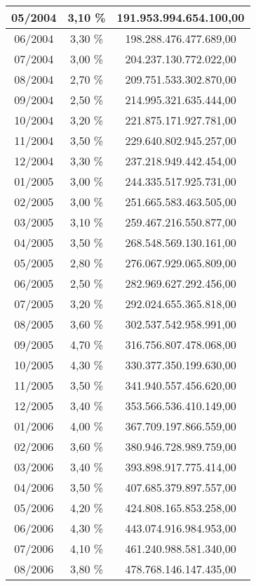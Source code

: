 \begin{center}
\begin{longtable}{|c|c|c|}
05/2004 & 3,10 \% & 191.953.994.654.100,00 \\ \hline
06/2004 & 3,30 \% & 198.288.476.477.689,00 \\ \hline
07/2004 & 3,00 \% & 204.237.130.772.022,00 \\ \hline
08/2004 & 2,70 \% & 209.751.533.302.870,00 \\ \hline
09/2004 & 2,50 \% & 214.995.321.635.444,00 \\ \hline
10/2004 & 3,20 \% & 221.875.171.927.781,00 \\ \hline
11/2004 & 3,50 \% & 229.640.802.945.257,00 \\ \hline
12/2004 & 3,30 \% & 237.218.949.442.454,00 \\ \hline
01/2005 & 3,00 \% & 244.335.517.925.731,00 \\ \hline
02/2005 & 3,00 \% & 251.665.583.463.505,00 \\ \hline
03/2005 & 3,10 \% & 259.467.216.550.877,00 \\ \hline
04/2005 & 3,50 \% & 268.548.569.130.161,00 \\ \hline
05/2005 & 2,80 \% & 276.067.929.065.809,00 \\ \hline
06/2005 & 2,50 \% & 282.969.627.292.456,00 \\ \hline
07/2005 & 3,20 \% & 292.024.655.365.818,00 \\ \hline
08/2005 & 3,60 \% & 302.537.542.958.991,00 \\ \hline
09/2005 & 4,70 \% & 316.756.807.478.068,00 \\ \hline
10/2005 & 4,30 \% & 330.377.350.199.630,00 \\ \hline
11/2005 & 3,50 \% & 341.940.557.456.620,00 \\ \hline
12/2005 & 3,40 \% & 353.566.536.410.149,00 \\ \hline
01/2006 & 4,00 \% & 367.709.197.866.559,00 \\ \hline
02/2006 & 3,60 \% & 380.946.728.989.759,00 \\ \hline
03/2006 & 3,40 \% & 393.898.917.775.414,00 \\ \hline
04/2006 & 3,50 \% & 407.685.379.897.557,00 \\ \hline
05/2006 & 4,20 \% & 424.808.165.853.258,00 \\ \hline
06/2006 & 4,30 \% & 443.074.916.984.953,00 \\ \hline
07/2006 & 4,10 \% & 461.240.988.581.340,00 \\ \hline
08/2006 & 3,80 \% & 478.768.146.147.435,00 \\ \hline

\end{longtable}
\end{center}
